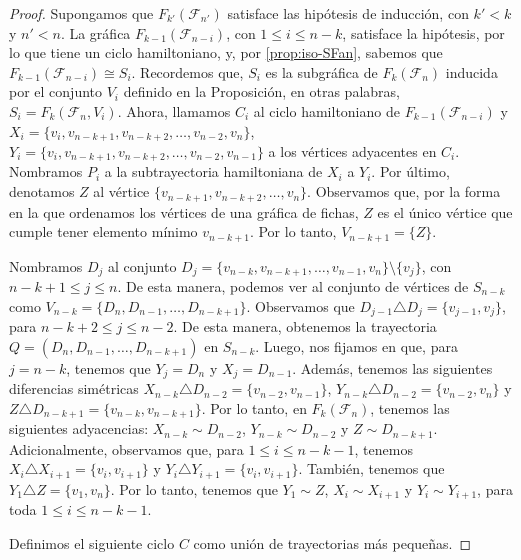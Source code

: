 \begin{proof}
    Supongamos que $F_{k'}(\mathcal{F}_{n'})$ satisface las hip\'otesis de
    inducci\'on, con $k'< k$ y $n'<n$. La gr\'afica
    $F_{k-1}(\mathcal{F}_{n-i})$, con $1 \leq i \leq n-k$, satisface la
    hip\'otesis, por lo que tiene un ciclo hamiltoniano, y, por
    \cref{prop:iso-SFan}, sabemos que $F_{k-1}(\mathcal{F}_{n-i}) \cong S_i$.
    Recordemos que,  $S_i$ es la subgr\'afica de $F_k(\mathcal{F}_n)$ inducida
    por el conjunto $V_i$ definido en la Proposici\'on, en otras palabras, $S_i=
    F_k(\mathcal{F}_n, V_i)$. Ahora, llamamos $C_i$ al ciclo hamiltoniano de
    $F_{k-1}(\mathcal{F}_{n-i})$ y $X_i = \{v_i, v_{n-k+1}, v_{n-k+2}, \dots,
    v_{n-2}, v_n\}$, $Y_i= \{v_i, v_{n-k+1}, v_{n-k+2}, \dots, v_{n-2},
    v_{n-1}\}$ a los v\'ertices adyacentes en $C_i$. Nombramos $P_i$ a la
    subtrayectoria hamiltoniana de $X_i$ a $Y_i$. Por \'ultimo, denotamos $Z$ al
    v\'ertice $\{v_{n-k+1}, v_{n-k+2}, \dots, v_n\}$. Observamos que, por la
    forma en la que ordenamos los v\'ertices de una gr\'afica de fichas, $Z$ es
    el \'unico v\'ertice que cumple tener elemento m\'inimo $v_{n-k+1}$. Por lo
    tanto, $V_{n-k+1} = \{Z\}$. 
    
    Nombramos $D_j$ al conjunto $D_j =\{v_{n-k}, v_{n-k+1}, \dots, v_{n-1},
    v_n\} \setminus \{v_j\}$, con $n-k+1 \leq j \leq n$.  De esta manera,
    podemos ver al conjunto de v\'ertices de $S_{n-k}$ como $V_{n-k}=\{D_n,
    D_{n-1}, \dots, D_{n-k+1}\}$. Observamos que $D_{j-1} \triangle D_j=
    \{v_{j-1}, v_j\}$, para $n-k+2 \leq j \leq n-2$. De esta manera, obtenemos
    la trayectoria $Q= (D_n, D_{n-1}, \dots, D_{n-k+1})$ en $S_{n-k}$.     
    Luego, nos fijamos en que, para $j= n-k$, tenemos que $Y_j = D_n$ y $X_j=
    D_{n-1}$. Adem\'as, tenemos las siguientes diferencias sim\'etricas
    $X_{n-k}\triangle D_{n-2} =\{v_{n-2}, v_{n-1}\}$, $Y_{n-k}\triangle D_{n-2}
    =\{v_{n-2}, v_n\}$ y $Z\triangle D_{n-k+1} =\{v_{n-k}, v_{n-k+1}\}$. Por lo
    tanto, en $F_k(\mathcal{F}_n)$, tenemos las siguientes adyacencias: $X_{n-k}
    \sim D_{n-2}$, $Y_{n-k} \sim D_{n-2}$ y $Z \sim D_{n-k+1}$. Adicionalmente,
    observamos que, para $1 \leq i \leq n- k- 1$, tenemos $X_{i} \triangle
    X_{i+1}= \{v_i, v_{i+1}\}$ y $Y_i \triangle Y_{i+1} = \{v_i, v_{i+1}\}$.
    Tambi\'en, tenemos que $Y_1 \triangle Z = \{v_1, v_n\}$. Por lo tanto,
    tenemos que $Y_1 \sim Z$, $X_i \sim X_{i+1}$ y $Y_i \sim Y_{i+1}$, para toda
    $1 \leq i \leq n-k-1$.
            
    Definimos el siguiente ciclo $C$ como uni\'on de trayectorias m\'as
    peque\~{n}as.
    

\end{proof}
